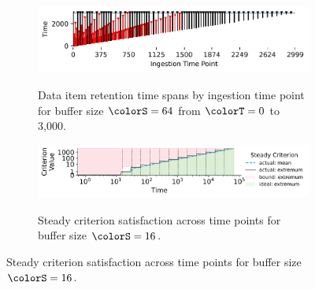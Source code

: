 \begin{figure}[htbp!]
   \begin{minipage}[]{\textwidth}
   \vspace{-2pt}
  \begin{subfigure}[t]{0.7\linewidth}
  \vspace{0pt}
    \centering
    \includegraphics[width=0.88\linewidth,clip]{binder/teeplots/11/num-generations=262144+surface-size=64+viz=stratum-persistence-dripplot+ext=}
  \end{subfigure}%
  \begin{subfigure}[t]{0.3\linewidth}
  \vspace{-2pt}
  \caption{%
    Data item retention time spans by ingestion time point for buffer size $\colorS=64$ from $\colorT=0$ to 3,000.
  }
  \label{fig:hsurf-steady-implementation-dripplot}
  \end{subfigure}
  \end{minipage}

 \begin{minipage}[]{\textwidth}
 \vspace{-2pt}
\begin{subfigure}[t]{0.7\linewidth}
\vspace{0pt}
  \centering
  \includegraphics[width=0.88\linewidth,clip]{binder/teeplots/11/hue=kind+surface-size=16+viz=criterion-satisfaction-lineplot+x=rank+y=steady-criterion+yscale=symlog+ext=}
\end{subfigure}%
\begin{subfigure}[t]{0.3\linewidth}
\vspace{-2pt}
\caption{%
  Steady criterion satisfaction across time points for buffer size $\colorS=16$.
}
\label{fig:hsurf-steady-implementation-satisfaction}
\end{subfigure}
\end{minipage}


\end{figure}
